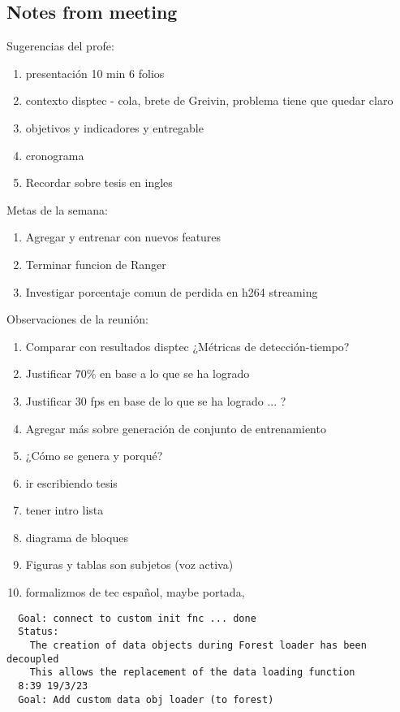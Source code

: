 \documentclass[12pt,oneside]{book}
\begin{document}
  \subsection*{Notes from meeting}

  Sugerencias del profe:
  \begin{enumerate}
    \item presentación 10 min 6 folios
    \item contexto disptec - cola, brete de Greivin, problema tiene que quedar claro
    \item objetivos y indicadores y entregable
    \item cronograma
    \item Recordar sobre tesis en ingles
  \end{enumerate}

  Metas de la semana:
  \begin{enumerate}
    \item Agregar y entrenar con nuevos features
    \item Terminar funcion de Ranger
    \item Investigar porcentaje comun de perdida en h264 streaming
  \end{enumerate}

  Observaciones de la reunión:
  \begin{enumerate}
    \item Comparar con resultados disptec ¿Métricas de detección-tiempo?
    \item Justificar 70\% en base a lo que se ha logrado
    \item Justificar 30 fps en base de lo que se ha logrado ... ?
    \item Agregar más sobre generación de conjunto de entrenamiento
    \item ¿Cómo se genera y porqué?
    \item ir escribiendo tesis
    \item tener intro lista
    \item diagrama de bloques
    \item Figuras y tablas son subjetos (voz activa)
    \item formalizmos de tec español, maybe portada, 
  \end{enumerate}

\begin{lstlisting}
  Goal: connect to custom init fnc ... done
  Status:
    The creation of data objects during Forest loader has been decoupled
    This allows the replacement of the data loading function
  8:39 19/3/23
  Goal: Add custom data obj loader (to forest)
  
\end{lstlisting}

  \printbibliography[title={Bibliografía},heading=bibintoc]
\end{document}
